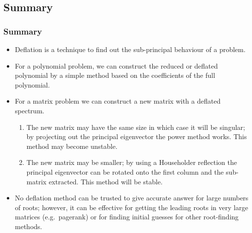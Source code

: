 \documentclass{beamer}
\begin{document}
\subsection{Summary}

\begin{frame}
  \frametitle{Summary}

  \begin{itemize}
  \item Deflation is a technique to find out the sub-principal
    behaviour of a problem.
  \item For a polynomial problem, we can construct the reduced or
    deflated polynomial by a simple method based on the coefficients
    of the full polynomial.
  \item For a matrix problem we can construct a new matrix with a
    deflated spectrum.
    \begin{enumerate}
    \item The new matrix may have the same size in which case it will
      be singular; by projecting out the principal eigenvector the
      power method works. This method may become unstable.
    \item The new matrix may be smaller; by using a Householder
      reflection the principal eigenvector can be rotated onto the
      first column and the sub-matrix extracted. This method will be
      stable.
    \end{enumerate}
  \item No deflation method can be trusted to give accurate answer for
    large numbers of roots; however, it can be effective for getting
    the leading roots in very large matrices (e.g.\ {\sc pagerank}) or
    for finding initial guesses for other root-finding methods.
  \end{itemize}

\end{frame}
\end{document}
